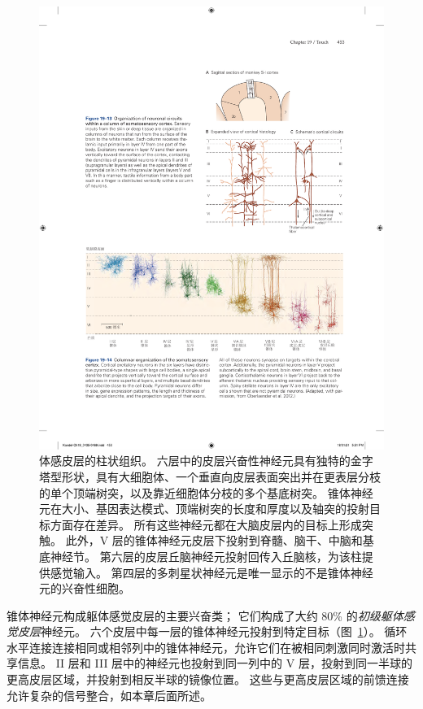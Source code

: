 \begin{figure}[htbp]
	\centering
	\includegraphics[width=1.0\linewidth]{chap19/fig_19_14}
	\caption{体感皮层的柱状组织。
		六层中的皮层兴奋性神经元具有独特的金字塔型形状，具有大细胞体、一个垂直向皮层表面突出并在更表层分枝的单个顶端树突，以及靠近细胞体分枝的多个基底树突。
		锥体神经元在大小、基因表达模式、顶端树突的长度和厚度以及轴突的投射目标方面存在差异。
		所有这些神经元都在大脑皮层内的目标上形成突触。
		此外，V 层的锥体神经元皮层下投射到脊髓、脑干、中脑和基底神经节。
		第六层的皮层丘脑神经元投射回传入丘脑核，为该柱提供感觉输入。
		第四层的多刺星状神经元是唯一显示的不是锥体神经元的兴奋性细胞\cite{oberlaender2012cell}。}
	\label{fig:19_14}
\end{figure}


锥体神经元构成躯体感觉皮层的主要兴奋类；
它们构成了大约 80\% 的\textit{初级躯体感觉皮层}神经元。 
六个皮层中每一层的锥体神经元投射到特定目标（图~\ref{fig:19_14}）。
循环水平连接连接相同或相邻列中的锥体神经元，允许它们在被相同刺激同时激活时共享信息。
II 层和 III 层中的神经元也投射到同一列中的 V 层，投射到同一半球的更高皮层区域，并投射到相反半球的镜像位置。
这些与更高皮层区域的前馈连接允许复杂的信号整合，如本章后面所述。


